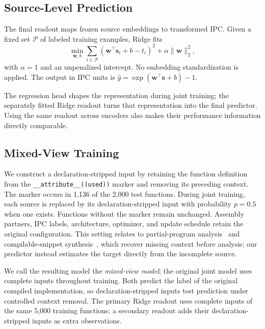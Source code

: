 \documentclass[conference]{IEEEtran}
\newenvironment{newtext}{\begingroup}{\endgroup}
\begin{document}
\subsection{Source-Level Prediction}
The final readout maps frozen source embeddings to transformed IPC. Given a fixed set $\mathcal{P}$ of labeled training examples, Ridge fits
\begin{equation}
\min_{\mathbf{w},b}\sum_{i\in\mathcal{P}}(\mathbf{w}^{\top}\mathbf{s}_i+b-t_i)^2+\alpha\lVert\mathbf{w}\rVert_2^2,
\end{equation}
with $\alpha=1$ and an unpenalized intercept. No embedding standardization is applied. The output in IPC units is $\hat{y}=\exp(\mathbf{w}^{\top}\mathbf{s}+b)-1$.

The regression head shapes the representation during joint training; the separately fitted Ridge readout turns that representation into the final predictor. Using the same readout across encoders also makes their performance information directly comparable. 

\begin{newtext}
\subsection{Mixed-View Training}
\label{sec:aug}
We construct a declaration-stripped input by retaining the function definition from the \texttt{\_\_attribute\_\_((used))} marker and removing its preceding context. The marker occurs in 1,136 of the 2,000 test functions. During joint training, each source is replaced by its declaration-stripped input with probability $p=0.5$ when one exists. Functions without the marker remain unchanged. Assembly partners, IPC labels, architecture, optimizer, and update schedule retain the original configuration. This setting relates to partial-program analysis~\cite{dagenais2008partial} and compilable-snippet synthesis~\cite{terragni2016csnippex}, which recover missing context before analysis; our predictor instead estimates the target directly from the incomplete source.

We call the resulting model the \emph{mixed-view model}; the original joint model uses complete inputs throughout training. Both predict the label of the original compiled implementation, so declaration-stripped inputs test prediction under controlled context removal. The primary Ridge readout uses complete inputs of the same 5,000 training functions; a secondary readout adds their declaration-stripped inputs as extra observations.
\end{newtext}
\end{document}

